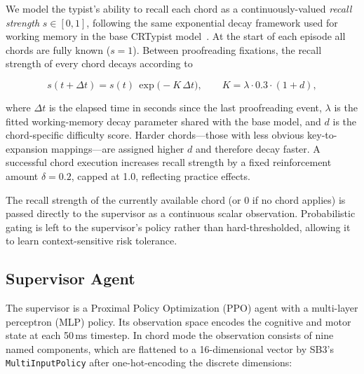 \documentclass[sigconf,review,anonymous]{acmart}
\begin{document}
We model the typist's ability to recall each chord as a continuously-valued
\emph{recall strength} $s \in [0,1]$, following the same exponential decay
framework used for working memory in the base CRTypist model~\cite{crtypist}.
At the start of each episode all chords are fully known ($s = 1$).  Between
proofreading fixations, the recall strength of every chord decays according
to

\begin{equation}
  s(t + \Delta t) = s(t)\,\exp\!\bigl(-K\,\Delta t\bigr),
  \qquad K = \lambda \cdot 0.3 \cdot (1 + d),
  \label{eq:chord_decay}
\end{equation}

\noindent where $\Delta t$ is the elapsed time in seconds since the last
proofreading event, $\lambda$ is the fitted working-memory decay parameter
shared with the base model, and $d$ is the chord-specific difficulty score.
Harder chords—those with less obvious key-to-expansion mappings—are
assigned higher $d$ and therefore decay faster.  A successful chord
execution increases recall strength by a fixed reinforcement amount
$\delta = 0.2$, capped at 1.0, reflecting practice effects.

The recall strength of the currently available chord (or 0 if no chord
applies) is passed directly to the supervisor as a continuous scalar
observation.  Probabilistic gating is left to the supervisor's policy
rather than hard-thresholded, allowing it to learn context-sensitive
risk tolerance.

\subsection{Supervisor Agent}
\label{sec:supervisor}

The supervisor is a Proximal Policy Optimization (PPO) agent with a
multi-layer perceptron (MLP) policy.  Its observation space encodes the
cognitive and motor state at each 50\,ms timestep.  In chord mode the
observation consists of nine named components, which are flattened to a
16-dimensional vector by SB3's \texttt{MultiInputPolicy} after
one-hot-encoding the discrete dimensions:
\end{document}

